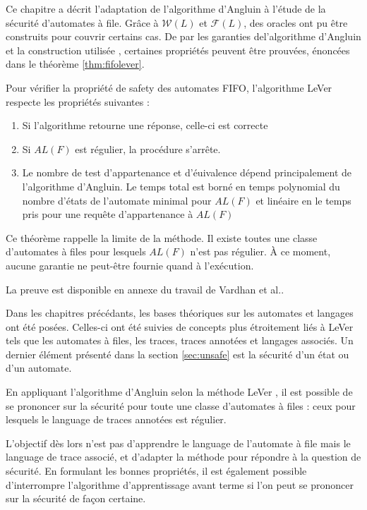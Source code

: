 Ce chapitre a décrit l'adaptation de l'algorithme d'Angluin à l'étude de la sécurité d'automates à file. Grâce à $\mathcal{W}(L)$ et $\mathcal{F}(L)$, des oracles ont pu être construits pour couvrir certains cas. De par les garanties del'algorithme d'Angluin\cite{Angluin87} et la construction utilisée \cite{Vardhan04}, certaines propriétés peuvent être prouvées, énoncées dans le théorème \ref{thm:fifolever}.

\begin{theorem}\label{thm:fifolever}
  Pour vérifier la propriété de safety des automates FIFO, l'algorithme LeVer respecte les propriétés suivantes :
  \begin{enumerate}
    \item Si l'algorithme retourne une réponse, celle-ci est correcte
    \item Si $AL(F)$ est régulier, la procédure s'arrête.
    \item Le nombre de test d'appartenance et d'éuivalence dépend principalement de l'algorithme d'Angluin. Le temps total est borné en temps polynomial du nombre d'états de l'automate minimal pour $AL(F)$ et linéaire en le temps pris pour une requête d'appartenance à $AL(F)$
  \end{enumerate}
\end{theorem}

Ce théorème rappelle la limite de la méthode. Il existe toutes une classe d'automates à files pour lesquels $AL(F)$ n'est pas régulier. À ce moment, aucune garantie ne peut-être fournie quand à l'exécution.

La preuve est disponible en annexe du travail de Vardhan et al.\cite{Vardhan04}.


Dans les chapitres précédants, les bases théoriques sur les automates et langages ont été posées. Celles-ci ont été suivies de concepts plus étroitement liés à LeVer tels que les automates à files, les traces, traces annotées et langages associés. Un dernier élément présenté dans la section \ref{sec:unsafe} est la sécurité d'un état ou d'un automate.

En appliquant l'algorithme d'Angluin \cite{Angluin87} selon la méthode LeVer \cite{Vardhan04}, il est possible de se prononcer sur la sécurité pour toute une classe d'automates à files : ceux pour lesquels le language de traces annotées est régulier.

L'objectif dès lors n'est pas d'apprendre le language de l'automate à file mais le language de trace associé, et d'adapter la méthode pour répondre à la question de sécurité. En formulant les bonnes propriétés, il est également possible d'interrompre l'algorithme d'apprentissage avant terme si l'on peut se prononcer sur la sécurité de façon certaine.


